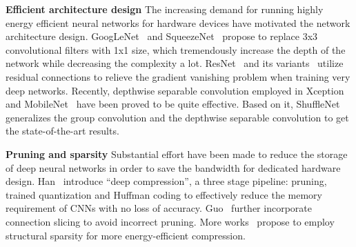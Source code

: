 \textbf{Efficient architecture design}
The increasing demand for running highly energy efficient neural networks for hardware devices have motivated the network architecture design. GoogLeNet~\cite{szegedy2015going} and SqueezeNet~\cite{iandola2016squeezenet} propose to replace 3x3 convolutional filters with 1x1 size, which tremendously increase the depth of the network while decreasing the complexity a lot. ResNet~\cite{he2016deep} and its variants~\cite{zagoruyko2016wide, he2016identity} utilize residual connections to relieve the gradient vanishing problem when training very deep networks. Recently, depthwise separable convolution employed in Xception~\cite{chollet2016xception} and  MobileNet~\cite{howard2017mobilenets} have been proved to be quite effective. Based on it, ShuffleNet~\cite{zhang2017shufflenet} generalizes the group convolution and the depthwise separable convolution to get the state-of-the-art results. 

\textbf{Pruning and sparsity}
Substantial effort have been made to reduce the storage of deep neural networks in order to save the bandwidth for dedicated hardware design. Han~\etal \cite{han2015learning, han2015deep} introduce ``deep compression'', a three stage pipeline: pruning, trained quantization and Huffman coding to effectively reduce the memory requirement of CNNs with no loss of accuracy. Guo~\etal \cite{guo2016dynamic} further incorporate connection slicing to avoid incorrect pruning. More works~\cite{wen2016learning, lebedev2016fast, liu2015sparse} propose to employ structural sparsity for more energy-efficient compression. 


